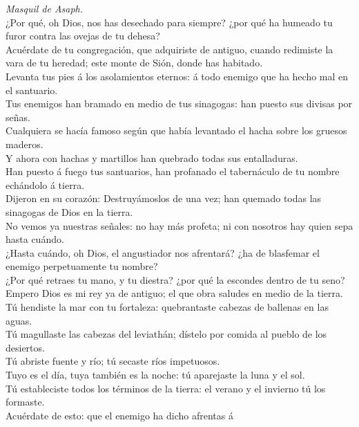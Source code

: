  \emph{Masquil de Asaph.}\\
¿Por qué, oh Dios, nos has desechado para siempre? ¿por qué ha humeado
tu furor contra las ovejas de tu dehesa?\\
 Acuérdate de tu congregación, que adquiriste de antiguo,
cuando redimiste la vara de tu heredad; este monte de Sión, donde has
habitado.\\
 Levanta tus pies á los asolamientos eternos: á todo enemigo
que ha hecho mal en el santuario.\\
 Tus enemigos han bramado en medio de tus sinagogas: han
puesto sus divisas por señas.\\
 Cualquiera se hacía famoso según que había levantado el
hacha sobre los gruesos maderos.\\
 Y ahora con hachas y martillos han quebrado todas sus
entalladuras.\\
 Han puesto á fuego tus santuarios, han profanado el
tabernáculo de tu nombre echándolo á tierra.\\
 Dijeron en su corazón: Destruyámoslos de una vez; han
quemado todas las sinagogas de Dios en la tierra.\\
 No vemos ya nuestras señales: no hay más profeta; ni con
nosotros hay quien sepa hasta cuándo.\\
 ¿Hasta cuándo, oh Dios, el angustiador nos afrentará? ¿ha
de blasfemar el enemigo perpetuamente tu nombre?\\
 ¿Por qué retraes tu mano, y tu diestra? ¿por qué la
escondes dentro de tu seno?\\
 Empero Dios es mi rey ya de antiguo; el que obra saludes
en medio de la tierra.\\
 Tú hendiste la mar con tu fortaleza: quebrantaste cabezas
de ballenas en las aguas.\\
 Tú magullaste las cabezas del leviathán; dístelo por
comida al pueblo de los desiertos.\\
 Tú abriste fuente y río; tú secaste ríos impetuosos.\\
 Tuyo es el día, tuya también es la noche: tú aparejaste la
luna y el sol.\\
 Tú estableciste todos los términos de la tierra: el verano
y el invierno tú los formaste.\\
 Acuérdate de esto: que el enemigo ha dicho afrentas á

